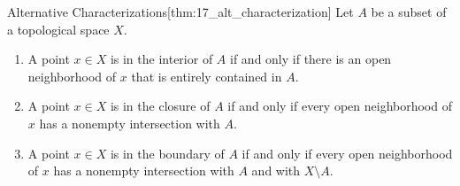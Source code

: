 \begin{thmBox}{Alternative Characterizations}[thm:17_alt_characterization]
    Let \( A \) be a subset of a topological space \( X \).
    \begin{enumerate}[label = (\alph*)]
        \item A point \( x \in X \) is in the interior of \( A \) if and only 
            if there is an open neighborhood of \( x \) that is entirely 
            contained in \( A \).
        \item A point \( x \in X \) is in the closure of \( A \) if and only 
            if every open neighborhood of \( x \) has a nonempty intersection 
            with \( A \).
        \item A point \( x \in X \) is in the boundary of \( A \) if and only 
            if every open neighborhood of \( x \) has a nonempty intersection 
            with \( A \) and with \( X \setminus A \).
    \end{enumerate}

    \baseRule

    \begin{proofBox}

    \end{proofBox}
\end{thmBox}

